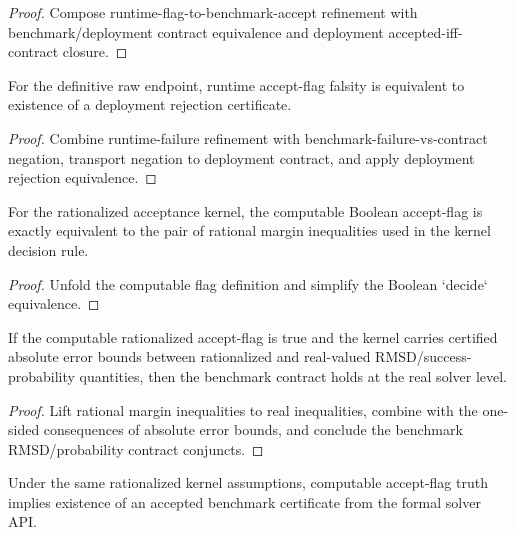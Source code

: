 \begin{proof}
Compose runtime-flag-to-benchmark-accept refinement with benchmark/deployment contract equivalence and deployment accepted-iff-contract closure.
\end{proof}

\begin{theorem}\label{thm:definitive-reject-flag-iff-deployment-rejected}
For the definitive raw endpoint, runtime accept-flag falsity is equivalent to existence of a deployment rejection certificate.
\end{theorem}

\begin{proof}
Combine runtime-failure refinement with benchmark-failure-vs-contract negation, transport negation to deployment contract, and apply deployment rejection equivalence.
\end{proof}

\begin{theorem}\label{thm:computable-rational-accept-flag-exactness}
For the rationalized acceptance kernel, the computable Boolean accept-flag is exactly equivalent to the pair of rational margin inequalities used in the kernel decision rule.
\end{theorem}

\begin{proof}
Unfold the computable flag definition and simplify the Boolean `decide` equivalence.
\end{proof}

\begin{theorem}\label{thm:computable-rational-accept-soundness}
If the computable rationalized accept-flag is true and the kernel carries certified absolute error bounds between rationalized and real-valued RMSD/success-probability quantities, then the benchmark contract holds at the real solver level.
\end{theorem}

\begin{proof}
Lift rational margin inequalities to real inequalities, combine with the one-sided consequences of absolute error bounds, and conclude the benchmark RMSD/probability contract conjuncts.
\end{proof}

\begin{theorem}\label{thm:computable-rational-accept-refines-benchmark-accept}
Under the same rationalized kernel assumptions, computable accept-flag truth implies existence of an accepted benchmark certificate from the formal solver API.
\end{theorem}

